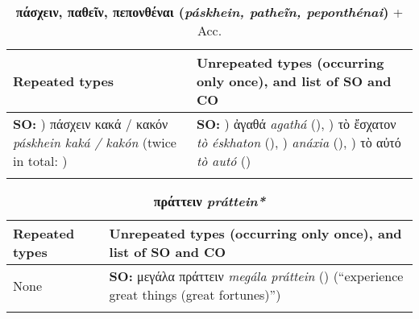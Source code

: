 \documentclass[output=paper,colorlinks,citecolor=brown]{langscibook}
\begin{document}
\clearpage

\begin{table}
\caption{\textbf{πάσχειν, παθεῖν, πεπονθέναι (\textit{páskhein, patheĩn, peponthénai})} + Acc.}
\footnotesize
\begin{tabularx}{\textwidth}{QQ}
        \lsptoprule
        Repeated types%
        & Unrepeated types (occurring only once), and list of SO and CO     \\
        \midrule
\textbf{SO:}
) πάσχειν κακά / κακόν \textit{páskhein kaká / kakón} (twice in total: )\newline
&
\textbf{SO:}
) ἀγαθά \textit{agathá} (),
) τὸ ἔσχατον \textit{tò éskhaton} (),
) \textit{anáxia} (),
) τὸ αὐτό \textit{tò autó} ()\\
        \lspbottomrule
\end{tabularx}
\end{table}

\begin{table}
\caption{\textbf{πράττειν \textit{práttein*}}}\label{tab:endexampledata2}
\footnotesize
\begin{tabularx}{\textwidth}{lQ}
        \lsptoprule
        Repeated types%
        & Unrepeated types (occurring only once), and list of SO and CO     \\
        \midrule
None &
\textbf{SO:}
\newline μεγάλα πράττειν \textit{megála práttein} () (“experience great things (great fortunes)”)\\
        \lspbottomrule
\end{tabularx}
\end{table}
\end{document}
